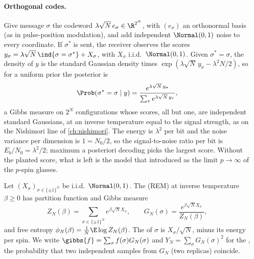 \begin{refsection}
\paragraph{Orthogonal codes.} Give message $\sigma$ the codeword $\lambda\sqrt N\,e_\sigma\in\R^{2^N}$, with $(e_\sigma)$ an orthonormal basis (as in pulse-position modulation), and add independent $\Normal(0,1)$ noise to every coordinate. If $\sigma^*$ is sent, the receiver observes the scores $y_\sigma=\lambda\sqrt N\,\ind\{\sigma=\sigma^*\}+X_\sigma$, with $X_\sigma$ i.i.d.\ $\Normal(0,1)$. Given $\sigma^*=\sigma$, the density of $y$ is the standard Gaussian density times $\exp(\lambda\sqrt N\,y_\sigma-\lambda^2N/2)$, so for a uniform prior the posterior is
\begin{equation}\label{eq:rem:posterior}
\Prob(\sigma^*=\sigma\mid y)=\frac{e^{\lambda\sqrt N\,y_\sigma}}{\sum_\tau e^{\lambda\sqrt N\,y_\tau}},
\end{equation}
a Gibbs measure on $2^N$ configurations whose scores, all but one, are independent standard Gaussians, at an inverse temperature equal to the signal strength, as on the Nishimori line of \cref{ch:nishimori}. The energy is $\lambda^2$ per bit and the noise variance per dimension is $1=N_0/2$, so the signal-to-noise ratio per bit is $E_b/N_0=\lambda^2/2$; maximum a posteriori decoding picks the largest score. Without the planted score, what is left is the model that \textcite{Derrida1980,Derrida1981} introduced as the limit $p\to\infty$ of the $p$-spin glasses.

\begin{definition}\label{def:rem:rem}
Let $(X_\sigma)_{\sigma\in\{\pm1\}^N}$ be i.i.d.\ $\Normal(0,1)$. The  (REM) at inverse temperature $\beta\ge0$ has partition function and Gibbs measure
\[
Z_N(\beta)=\sum_{\sigma\in\{\pm1\}^N}e^{\beta\sqrt N X_\sigma},\qquad G_N(\sigma)=\frac{e^{\beta\sqrt N X_\sigma}}{Z_N(\beta)},
\]
and free entropy $\phi_N(\beta)=\frac1N\E\log Z_N(\beta)$. The  of $\sigma$ is $X_\sigma/\sqrt N$, minus its energy per spin. We write $\gibbs{f}=\sum_\sigma f(\sigma)G_N(\sigma)$ and $Y_N=\sum_\sigma G_N(\sigma)^2$ for the , the probability that two independent samples from $G_N$ (two replicas) coincide.
\end{definition}


\end{refsection}
